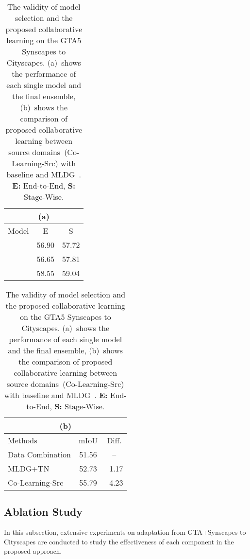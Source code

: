 \documentclass[final]{cvpr}
\begin{document}
\begin{table}
	\centering
	\caption{The validity of model selection and the proposed collaborative learning on the GTA5  Synscapes to Cityscapes. (a)~shows the performance of each single model and the final ensemble, (b)~shows the comparison of proposed collaborative learning between source domains~(Co-Learning-Src) with baseline and MLDG~\cite{zhang2020generalizable}. \textbf{E:} End-to-End, \textbf{S:} Stage-Wise.}
	\label{tab:col}
	\vspace{1mm}
\small
	\setlength{\tabcolsep}{0.78mm}
	\begin{tabular}{l|cc}
		\multicolumn{3}{c}{(a)}\\
		\hline
		\hline
		Model & E & S \\
		\hline
		 & 56.90 & 57.72 \\
		 & 56.65 & 57.81 \\
		\hline
		 & 58.55 & 59.04 \\
		\hline
	\end{tabular}
\hspace{2mm}
	\begin{tabular}{l|c|c}
		\multicolumn{3}{c}{(b)}\\
		\hline
\hline
		Methods  & mIoU & Diff. \\
		\hline
		Data Combination   & 51.56 & -- \\
		MLDG+TN~\cite{zhang2020generalizable}  & 52.73 & ~1.17\\
		\hline
Co-Learning-Src & 55.79 & ~4.23\\
\hline
	\end{tabular}
\vspace{-10pt}
\end{table}




\subsection{Ablation Study}
In this subsection, extensive experiments on adaptation from GTA+Synscapes to Cityscapes are conducted to study the effectiveness of each component in the proposed approach. 
\end{document}
